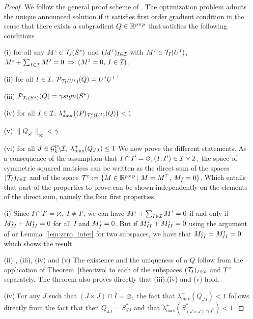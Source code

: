 \documentclass{article}
\begin{document}
\begin{proof}
We follow the general proof scheme of \citet{chandrasekaran2011rank}. The optimization problem admits the unique announced solution if it satisfies first order gradient condition in the sense that there exists a subgradient $Q \in \mathbb{R}^{p \times p}$ that satisfies the following conditions
\BET
\item[(i)] for all any $M^{\scriptscriptstyle s} \in \mathcal{T}_s(S^*)$ and $(M^{{\scriptscriptstyle I}})_{I \in \mathcal{I}}$ with $M^{{\scriptscriptstyle I}} \in \mathcal{T}_I(U^{{\scriptscriptstyle I}})$, $M^{\scriptscriptstyle s}+\sum_{I \in \mathcal{I}} M^{{\scriptscriptstyle I}}=0 \: \Rightarrow \: (M^{{\scriptscriptstyle I}}=0, \:I \in \mathcal{I})$.
\item[(ii)] for all $I \in \mathcal{I},\:\mathcal{P}_{\mathcal{T}_I(U^{{\scriptscriptstyle I}})}(Q)=U^{{\scriptscriptstyle I}}{U^{{\scriptscriptstyle I}}}^\top$
\item[(iii)] $\mathcal{P}_{\mathcal{T}_s(S^*)}(Q)=\gamma sign(S^*)$
\item[(iv)] for all $I \in \mathcal{I},\:\lambda_{\max}^+\big (\mathcal(P)_{\mathcal{T}_I^c(U^{{\scriptscriptstyle I}})}(Q) \big )<1$
\item[(v)] $\|Q_{S^c}\|_{\infty}<\gamma$
\item[(vi)] for all $J \in \mathcal{G}^p_k \backslash \mathcal{I}, \: \lambda_{\max}^+(Q_{JJ})\leq 1$
\EET
We now prove the different statements. As a consequence of the assumption that $I \cap I'=\varnothing, (I,I') \in \mathcal{I} \times \mathcal{I},$ the space of symmetric squared matrices can be written as the direct sum of the spaces $(\bar{\mathcal{T}}_I)_{I \in \mathcal{I}}$ and of the space $\mathcal{T}^c:=\{M \in \mathbb{R}^{p \times p} \mid  M=M^\top, \: M_{\bar{I}}=0\}$. Which entails that part of the properties to prove can be shown independently on the elements of the direct sum, namely the four first properties. 
\BET
\item[(i)] Since $I \cap I'=\varnothing,\: I\neq I'$, we can have $M^{\scriptscriptstyle s}+\sum_{I \in \mathcal{I}} M^{{\scriptscriptstyle I}}=0$ if and only if $M^{\scriptscriptstyle s}_{II}+ M^{{\scriptscriptstyle I}}_{II}=0$ for all $I$ and $M^{\scriptscriptstyle s}_{\bar{I}}=0$. But if $M^{\scriptscriptstyle s}_{II}+ M^{{\scriptscriptstyle I}}_{II}=0$ using the argument of \citet{chandrasekaran2011rank} or Lemma~\ref{lem:zero_inter} for two subspaces, we have that $M^{\scriptscriptstyle s}_{II}= M^{{\scriptscriptstyle I}}_{II}=0$ which shows the result.
\item[(ii)], (iii), (iv) and (v) The existence and the uniqueness of a $Q$ follow from the application of Theorem~\ref{theo:two} to each of the subspaces $(\mathcal{T}_I)_{I \in\mathcal{I}}$ and $\mathcal{T}^c$ separately. The theorem also proves directly that (iii),(iv) and (v) hold.
\item[(iv)] For any $J$ such that $(J \times J) \cap \bar{I}=\varnothing,$ the fact that $\lambda_{\max}^+(Q_{JJ})<1$ follows directly from the fact that then $Q_{JJ}=S^*_{JJ}$ and that $\lambda_{\max}^+(S^*_{(J \times J) \cap \bar{I}^c})<1$.

\end{proof}
\end{document}
